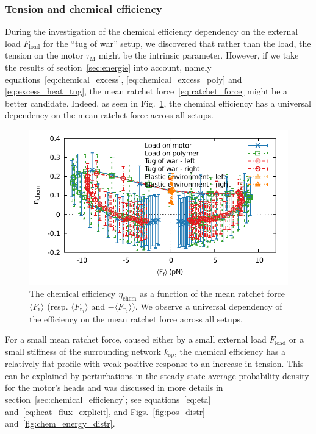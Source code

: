 \documentclass[aps,pre,twocolumn,showpacs,showkeys,superscriptaddress,floatfix]{revtex4-1}
\begin{document}
\subsubsection{Tension and chemical efficiency}
During the investigation of the chemical efficiency dependency on the external load $F_\text{load}$ for the ``tug of war'' setup, 
we discovered that rather than the load, the tension on the motor $\tau_\text{M}$ might be the intrinsic parameter. 
However, if we take the results of section~\ref{sec:energie} into account, namely equations~\eqref{eq:chemical_excess}, \eqref{eq:chemical_excess_poly} and \eqref{eq:excess_heat_tug}, 
the mean ratchet force~\eqref{eq:ratchet_force} might be a better candidate.
Indeed, as seen in Fig.~\ref{fig:ratchet_force_efficiency}, the chemical efficiency has a universal dependency on the mean ratchet force across all setups. 
\begin{figure}[t]
\centering
\includegraphics[width=.9\linewidth,height=!]{ratchet_eta}
\caption{\label{fig:ratchet_force_efficiency}
The chemical efficiency $\eta_\text{chem}$ as a function of the mean ratchet force $\langle F_\text{r} \rangle$ (resp. $\langle F_{\text{r}_1} \rangle$ and $-\langle F_{\text{r}_2} \rangle$).
We observe a universal dependency of the efficiency on the mean ratchet force across all setups. 
}
\end{figure}

For a small mean ratchet force, caused either by a small external load $F_\text{load}$ or a small stiffness of the surrounding network $k_\text{sp}$, 
the chemical efficiency has a relatively flat profile with weak positive response to an increase in tension.
This can be explained by perturbations in the steady state average probability density for the motor's heads 
and was discussed in more details in  section~\ref{sec:chemical_efficiency};
see equations~\eqref{eq:eta} and~\eqref{eq:heat_flux_explicit}, and Figs.~\ref{fig:pos_distr} and~\ref{fig:chem_energy_distr}.  
\end{document}
